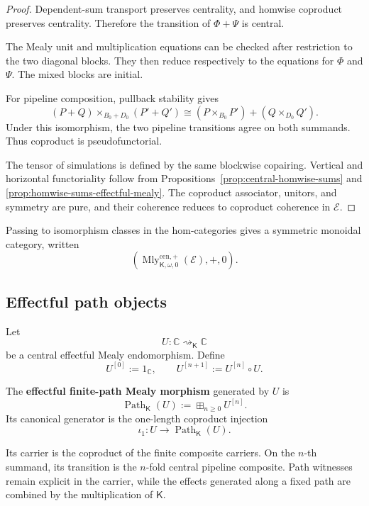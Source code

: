 \begin{proof}
Dependent-sum transport preserves centrality, and homwise coproduct preserves
centrality.  Therefore the transition of
\(\Phi+\Psi\) is central.

The Mealy unit and multiplication equations can be checked after restriction
to the two diagonal blocks.  They then reduce respectively to the equations
for \(\Phi\) and \(\Psi\).  The mixed blocks are initial.

For pipeline composition, pullback stability gives
\[
    (P+Q)\times_{B_0+D_0}(P'+Q')
    \cong
    (P\times_{B_0}P')
    +
    (Q\times_{D_0}Q').
\]
Under this isomorphism, the two pipeline transitions agree on both summands.
Thus coproduct is pseudofunctorial.

The tensor of simulations is defined by the same blockwise copairing.
Vertical and horizontal functoriality follow from
Propositions~\ref{prop:central-homwise-sums} and
\ref{prop:homwise-sums-effectful-mealy}.  The coproduct associator, unitors,
and symmetry are pure, and their coherence reduces to coproduct coherence in
\(\mathcal E\).
\end{proof}

Passing to isomorphism classes in the hom-categories gives a symmetric
monoidal category, written
\[
    \left(
        \operatorname{Mly}^{\mathrm{cen},+}_{\mathsf K,\omega,0}
        (\mathcal E),
        +,
        0
    \right).
\]

\subsection{Effectful path objects}
\label{subsec:effectful-path-objects}

Let
\[
    U:
    \mathbb C\rightsquigarrow_{\mathsf K}\mathbb C
\]
be a central effectful Mealy endomorphism.  Define
\[
    U^{[0]}:=1_{\mathbb C},
    \qquad
    U^{[n+1]}:=U^{[n]}\circ U.
\]

\begin{definition}
\label{def:effectful-finite-path-object}
The \textbf{effectful finite-path Mealy morphism} generated by \(U\) is
\[
    \operatorname{Path}_{\mathsf K}(U)
    :=
    \boxplus_{n\geq0}U^{[n]}.
\]
Its canonical generator is the one-length coproduct injection
\[
    \iota_1:
    U
    \longrightarrow
    \operatorname{Path}_{\mathsf K}(U).
\]
\end{definition}

Its carrier is the coproduct of the finite composite carriers.  On the
\(n\)-th summand, its transition is the \(n\)-fold central pipeline
composite.  Path witnesses remain explicit in the carrier, while the effects
generated along a fixed path are combined by the multiplication of
\(\mathsf K\).

